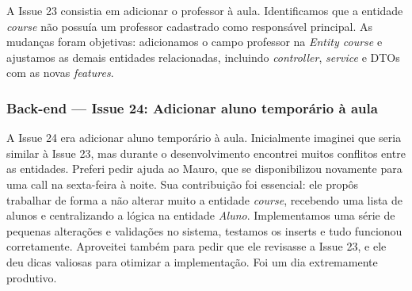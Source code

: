 A Issue 23 consistia em adicionar o professor à aula. Identificamos que a entidade
\textit{course} não possuía um professor cadastrado como responsável principal.
As mudanças foram objetivas: adicionamos o campo professor na \textit{Entity course}
e ajustamos as demais entidades relacionadas, incluindo \textit{controller},
\textit{service} e DTOs com as novas \textit{features}.

\subsubsection*{Back-end --- Issue 24: Adicionar aluno temporário à aula}

A Issue 24 era adicionar aluno temporário à aula. Inicialmente imaginei que seria
similar à Issue 23, mas durante o desenvolvimento encontrei muitos conflitos entre
as entidades. Preferi pedir ajuda ao Mauro, que se disponibilizou novamente para uma
call na sexta-feira à noite. Sua contribuição foi essencial: ele propôs trabalhar de
forma a não alterar muito a entidade \textit{course}, recebendo uma lista de alunos e
centralizando a lógica na entidade \textit{Aluno}. Implementamos uma série de
pequenas alterações e validações no sistema, testamos os inserts e tudo funcionou
corretamente. Aproveitei também para pedir que ele revisasse a Issue 23, e ele deu
dicas valiosas para otimizar a implementação. Foi um dia extremamente produtivo.

